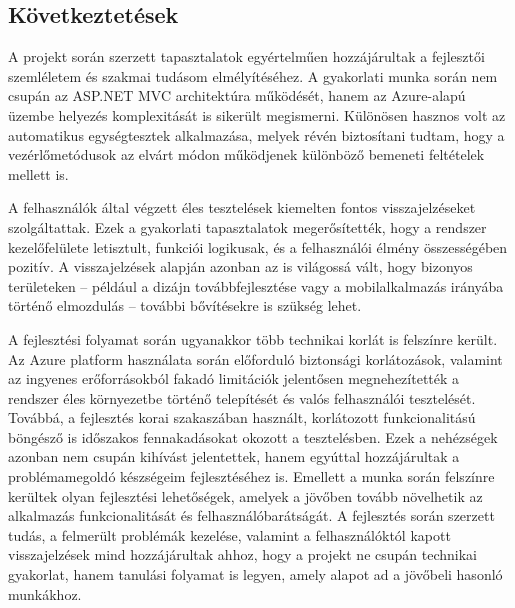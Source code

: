 \subsection{Következtetések}

A projekt során szerzett tapasztalatok egyértelműen hozzájárultak a fejlesztői szemléletem és szakmai tudásom elmélyítéséhez. A gyakorlati munka során nem csupán az ASP.NET MVC architektúra működését, hanem az Azure-alapú üzembe helyezés komplexitását is sikerült megismerni. Különösen hasznos volt az automatikus egységtesztek alkalmazása, melyek révén biztosítani tudtam, hogy a vezérlőmetódusok az elvárt módon működjenek különböző bemeneti feltételek mellett is.

A felhasználók által végzett éles tesztelések kiemelten fontos visszajelzéseket szolgáltattak. Ezek a gyakorlati tapasztalatok megerősítették, hogy a rendszer kezelőfelülete letisztult, funkciói logikusak, és a felhasználói élmény összességében pozitív. A visszajelzések alapján azonban az is világossá vált, hogy bizonyos területeken – például a dizájn továbbfejlesztése vagy a mobilalkalmazás irányába történő elmozdulás – további bővítésekre is szükség lehet.

A fejlesztési folyamat során ugyanakkor több technikai korlát is felszínre került. Az Azure platform használata során előforduló biztonsági korlátozások, valamint az ingyenes erőforrásokból fakadó limitációk jelentősen megnehezítették a rendszer éles környezetbe történő telepítését és valós felhasználói tesztelését. Továbbá, a fejlesztés korai szakaszában használt, korlátozott funkcionalitású böngésző is időszakos fennakadásokat okozott a tesztelésben. Ezek a nehézségek azonban nem csupán kihívást jelentettek, hanem egyúttal hozzájárultak a problémamegoldó készségeim fejlesztéséhez is. Emellett a munka során felszínre kerültek olyan fejlesztési lehetőségek, amelyek a jövőben tovább növelhetik az alkalmazás funkcionalitását és felhasználóbarátságát. A fejlesztés során szerzett tudás, a felmerült problémák kezelése, valamint a felhasználóktól kapott visszajelzések mind hozzájárultak ahhoz, hogy a projekt ne csupán technikai gyakorlat, hanem tanulási folyamat is legyen, amely alapot ad a jövőbeli hasonló munkákhoz.





